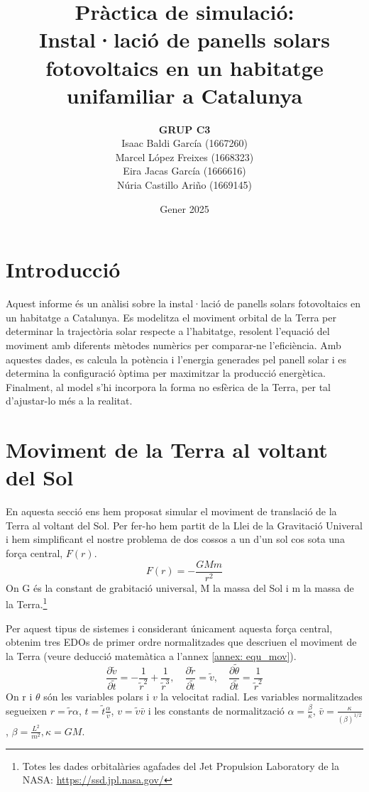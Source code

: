 \documentclass[11pt]{article}
\title{\Huge\bfseries Pràctica de simulació: \\ Instal·lació de panells solars fotovoltaics en un habitatge unifamiliar a Catalunya \\ [2ex] \Large}
\author{\begin{tabular}{c}
\textbf{GRUP C3} \\
Isaac Baldi García (1667260)\\
Marcel López Freixes (1668323) \\
Eira Jacas García (1666616) \\
Núria Castillo Ariño (1669145)
\end{tabular}}
\date{Gener 2025}
\begin{document}
\maketitle
\newpage

\tableofcontents
\newpage

\section{Introducció}
Aquest informe és un anàlisi sobre la instal·lació de panells solars fotovoltaics en un habitatge a Catalunya. Es modelitza el moviment orbital de la Terra per determinar la trajectòria solar respecte a l’habitatge, resolent l’equació del moviment amb diferents mètodes numèrics per comparar-ne l’eficiència. Amb aquestes dades, es calcula la potència i l’energia generades pel panell solar i es determina la configuració òptima per maximitzar la producció energètica. Finalment, al model s'hi incorpora la forma no esfèrica de la Terra, per tal d'ajustar-lo més a la realitat.

\section{Moviment de la Terra al voltant del Sol} \label{sec: seccio_1}
En aquesta secció ens hem proposat simular el moviment de translació de la Terra al voltant del Sol. Per fer-ho hem partit de la Llei de la Gravitació Univeral i hem simplificant el nostre problema de dos cossos a un d'un sol cos sota una força central, $F(r)$.
\begin{equation}
    F(r)=-\frac{GMm}{r^2}
\end{equation}
On G és la constant de grabitació universal, M la massa del Sol i m la massa de la Terra.\footnote{Totes les dades orbitalàries agafades del Jet Propulsion Laboratory de la NASA: \url{https://ssd.jpl.nasa.gov/}}

Per aquest tipus de sistemes i considerant únicament aquesta força central, obtenim tres EDOs de primer ordre normalitzades que descriuen el moviment de la Terra (veure deducció matemàtica a l'annex \ref{annex: equ_mov}).
\begin{equation}
    \frac{\partial\tilde{v}}{\partial\tilde{t}}=-\frac{1}{\tilde{r}^2}+\frac{1}{\tilde{r}^3}, \quad
    \frac{\partial\tilde{r}}{\partial\tilde{t}}=\tilde{v}, \quad
    \frac{\partial\tilde{\theta}}{\partial\tilde{t}}=\frac{1}{\tilde{r}^2}
    \label{eq:all}
\end{equation}
On r i $\theta$ són les variables polars i $v$ la velocitat radial. Les variables normalitzades segueixen $r=\tilde{r}\alpha$, $t=\tilde{t}\frac{\alpha}{\bar{v}}$, $v=\tilde{v}\bar{v}$ i les constants de normalització $\alpha = \frac{\beta}{\kappa}$, $\bar{v}=\frac{\kappa}{(\beta)^{1/2}}$, $\beta=\frac{L^2}{m^2}, \kappa=GM$. 
\end{document}
